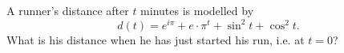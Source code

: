 A runner's distance after $t$ minutes is modelled by
\[d(t)=e^{i\pi}+e\cdot\pi^t+\sin^2 t+\cos^2 t.\]
What is his distance when he has just started his run, i.e. at $t=0$?
